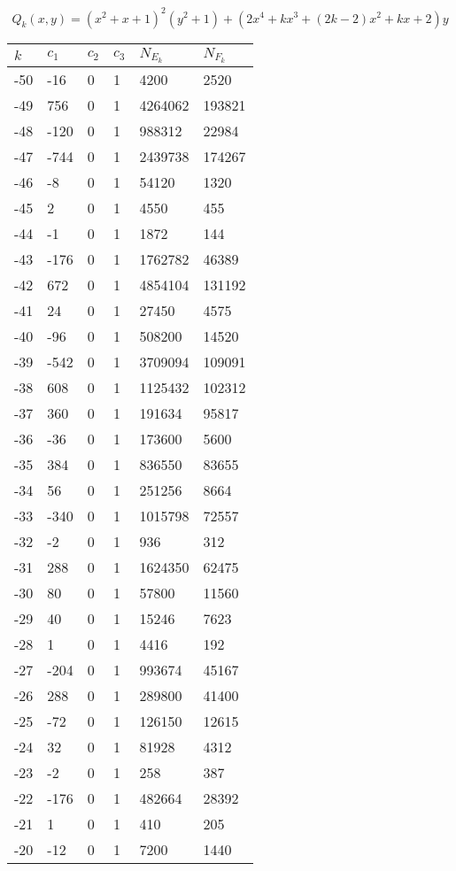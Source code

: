 \documentclass{amsart}
\begin{document}
\clearpage
$$Q_k(x,y)=(x^2+x+1)^2(y^2+1) + (2x^4 + kx^3 + (2k - 2)x^2 + kx + 2)y$$
\begin{longtable}{llllll}
\hline
$k$ & $c_1$ & $c_2$ & $c_3$ & $N_{E_k}$ & $N_{F_k}$\\
\hline
-50 & -16 & 0 & 1 & 4200 & 2520\\
-49 & 756 & 0 & 1 & 4264062 & 193821\\
-48 & -120 & 0 & 1 & 988312 & 22984\\
-47 & -744 & 0 & 1 & 2439738 & 174267\\
-46 & -8 & 0 & 1 & 54120 & 1320\\
-45 & 2 & 0 & 1 & 4550 & 455\\
-44 & -1 & 0 & 1 & 1872 & 144\\
-43 & -176 & 0 & 1 & 1762782 & 46389\\
-42 & 672 & 0 & 1 & 4854104 & 131192\\
-41 & 24 & 0 & 1 & 27450 & 4575\\
-40 & -96 & 0 & 1 & 508200 & 14520\\
-39 & -542 & 0 & 1 & 3709094 & 109091\\
-38 & 608 & 0 & 1 & 1125432 & 102312\\
-37 & 360 & 0 & 1 & 191634 & 95817\\
-36 & -36 & 0 & 1 & 173600 & 5600\\
-35 & 384 & 0 & 1 & 836550 & 83655\\
-34 & 56 & 0 & 1 & 251256 & 8664\\
-33 & -340 & 0 & 1 & 1015798 & 72557\\
-32 & -2 & 0 & 1 & 936 & 312\\
-31 & 288 & 0 & 1 & 1624350 & 62475\\
-30 & 80 & 0 & 1 & 57800 & 11560\\
-29 & 40 & 0 & 1 & 15246 & 7623\\
-28 & 1 & 0 & 1 & 4416 & 192\\
-27 & -204 & 0 & 1 & 993674 & 45167\\
-26 & 288 & 0 & 1 & 289800 & 41400\\
-25 & -72 & 0 & 1 & 126150 & 12615\\
-24 & 32 & 0 & 1 & 81928 & 4312\\
-23 & -2 & 0 & 1 & 258 & 387\\
-22 & -176 & 0 & 1 & 482664 & 28392\\
-21 & 1 & 0 & 1 & 410 & 205\\
-20 & -12 & 0 & 1 & 7200 & 1440\\

\end{longtable}
\end{document}
